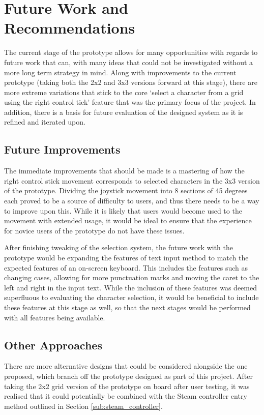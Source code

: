 \documentclass[future.tex]{subfiles}
\begin{document}
\section{Future Work and Recommendations} %
\label{sec:future_work_and_recommendations}
The current stage of the prototype allows for many opportunities with regards
to future work that can, with many ideas that could not be investigated without
a more long term strategy in mind. Along with improvements to the current
prototype (taking both the 2x2 and 3x3 versions forward at this stage), there
are more extreme variations that stick to the core `select a character from a
grid using the right control tick' feature that was the primary focus of the
project. In addition, there is a basis for future evaluation of the designed
system as it is refined and iterated upon.

\subsection{Future Improvements} %
\label{sub:future_improvements}
The immediate improvements that should be made is a mastering of how the right
control stick movement corresponds to selected characters in the 3x3 version of
the prototype. Dividing the joystick movement into 8 sections of 45 degrees each
proved to be a source of difficulty to users, and thus there needs to be a way
to improve upon this. While it is likely that users would become used to the
movement with extended usage, it would be ideal to ensure that the experience
for novice users of the prototype do not have these issues.

After finishing tweaking of the selection system, the future work with the
prototype would be expanding the features of text input method to match the
expected features of an on-screen keyboard. This includes the features such as
changing cases, allowing for more punctuation marks and moving the caret to the
left and right in the input text. While the inclusion of these features was
deemed superfluous to evaluating the character selection, it would be beneficial
to include these features at this stage as well, so that the next stages would
be performed with all features being available.

\subsection{Other Approaches} %
\label{sub:other_approaches}
There are more alternative designs that could be considered alongside the one
proposed, which branch off the prototype designed as part of this project.
After taking the 2x2 grid version of the prototype on board after user testing,
it was realised that it could potentially be combined with the Steam controller
entry method outlined in Section \ref{sub:steam_controller}.
\end{document}

